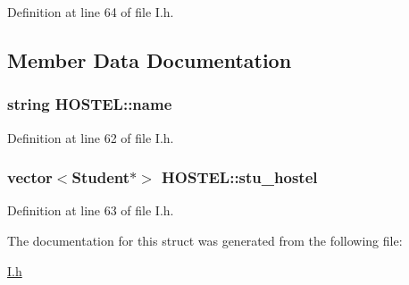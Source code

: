 \-Definition at line 64 of file \-I.\-h.



\subsection{\-Member \-Data \-Documentation}
\hypertarget{structHOSTEL_a677d765cbc7cf017b333b6dfcce2c867}{
\subsubsection[{name}]{\setlength{\rightskip}{0pt plus 5cm}string {\bf \-H\-O\-S\-T\-E\-L\-::name}}}\label{structHOSTEL_a677d765cbc7cf017b333b6dfcce2c867}


\-Definition at line 62 of file \-I.\-h.

\hypertarget{structHOSTEL_ab0cbbde1db68ae8a265ca7a64c583867}{
\subsubsection[{stu\-\_\-hostel}]{\setlength{\rightskip}{0pt plus 5cm}vector$<${\bf \-Student}$\ast$$>$ {\bf \-H\-O\-S\-T\-E\-L\-::stu\-\_\-hostel}}}\label{structHOSTEL_ab0cbbde1db68ae8a265ca7a64c583867}


\-Definition at line 63 of file \-I.\-h.



\-The documentation for this struct was generated from the following file\-:\begin{DoxyCompactItemize}
\item 
\hyperlink{I_8h}{\-I.\-h}\end{DoxyCompactItemize}
